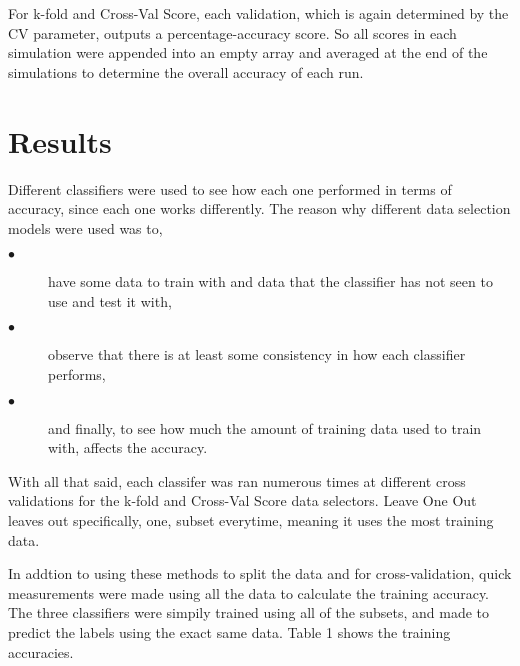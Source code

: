 \documentclass[conference,compsoc]{IEEEtran}
\begin{document}
For k-fold and Cross-Val Score, each validation, which is again determined by the CV parameter, outputs a percentage-accuracy score. So all scores in each simulation were appended into an empty array and averaged at the end of the simulations to determine the overall accuracy of each run.

\section{Results}
Different classifiers were used to see how each one performed in terms of accuracy, since each one works differently. The reason why different data selection models 
were used was to,
\begin{description}
	\item[$\bullet$] have some data to train with and data that the classifier has not seen to use and test it with,
	\item[$\bullet$] observe that there is at least some consistency in how each classifier performs,
	\item[$\bullet$] and finally, to see how much the amount of training data used to train with, affects the accuracy.
\end{description}
\noindent With all that said, each classifer was ran numerous times at different cross validations for the k-fold and Cross-Val Score data selectors. Leave One Out leaves out 
specifically, one, subset everytime, meaning it uses the most training data.

In addtion to using these methods to split the data and for cross-validation, quick measurements were made using all the data to calculate the training accuracy. The three classifiers were 
simpily trained using all of the subsets, and made to predict the labels using the exact same data. Table 1 shows the training accuracies.

\begin{table}[h]
\noindent{}	
	\caption{Training Accuracies}
	\label{table1}
\end{table}
\end{document}
